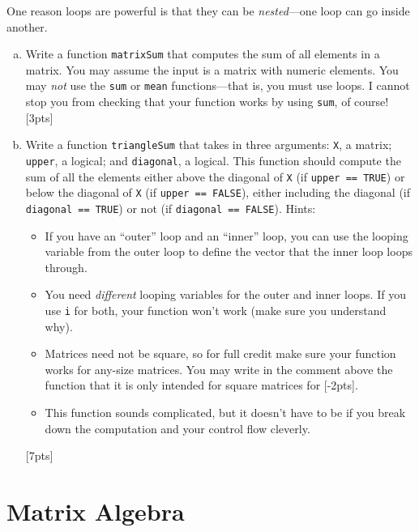 \documentclass[12pt]{article}
\begin{document}
One reason loops are powerful is that they can be \textit{nested}---one loop can go inside another.

\begin{enumerate}[(a)]
	\item Write a function \verb|matrixSum| that computes the sum of all elements in a matrix. You may assume the input is a matrix with numeric elements. You may \textit{not} use the \verb|sum| or \verb|mean| functions---that is, you must use loops. I cannot stop you from checking that your function works by using \verb|sum|, of course! [3pts]
	\item Write a function \verb|triangleSum| that takes in three arguments: \verb|X|, a matrix; \verb|upper|, a logical; and \verb|diagonal|, a logical. This function should compute the sum of all the elements either above the diagonal of \verb|X| (if \verb|upper == TRUE|) or below the diagonal of \verb|X| (if \verb|upper == FALSE|), either including the diagonal (if \verb|diagonal == TRUE|) or not (if \verb|diagonal == FALSE|). Hints:
	\begin{itemize}
		\item If you have an ``outer'' loop and an ``inner'' loop, you can use the looping variable from the outer loop to define the vector that the inner loop loops through.
		\item You need \textit{different} looping variables for the outer and inner loops. If you use \verb|i| for both, your function won't work (make sure you understand why).
		\item Matrices need not be square, so for full credit make sure your function works for any-size matrices. You may write in the comment above the function that it is only intended for square matrices for [-2pts].
		\item This function sounds complicated, but it doesn't have to be if you break down the computation and your control flow cleverly.
	\end{itemize}
	[7pts]
\end{enumerate}

\section{Matrix Algebra}
\end{document}
